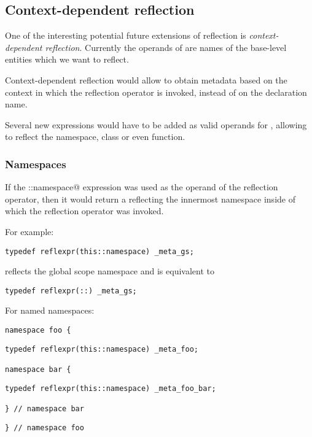 \subsection{Context-dependent reflection}
\label{context-dependent-reflection}

One of the interesting potential future extensions of reflection
is {\em context-dependent reflection}. Currently the operands of \verb@reflexpr@
are names of the base-level entities which we want to reflect.

Context-dependent reflection would allow to obtain metadata based on the context
in which the reflection operator is invoked, instead of on the declaration name.

Several new expressions would have to be added as valid operands for
\verb@reflexpr@, allowing to reflect the  namespace, class
or even function.

\subsubsection{Namespaces}

If the \verb@this::namespace@ expression was used as the operand of the reflection
operator, then it would return a  reflecting the innermost namespace
inside of which the reflection operator was invoked.

For example:

\begin{verbatim}
typedef reflexpr(this::namespace) _meta_gs;
\end{verbatim}

reflects the global scope namespace and is equivalent to

\begin{verbatim}
typedef reflexpr(::) _meta_gs;
\end{verbatim}

For named namespaces:

\begin{verbatim}
namespace foo {
\end{verbatim}
\begin{verbatim}
typedef reflexpr(this::namespace) _meta_foo;

namespace bar {
\end{verbatim}
\begin{verbatim}
typedef reflexpr(this::namespace) _meta_foo_bar;

} // namespace bar
\end{verbatim}
\begin{verbatim}
} // namespace foo
\end{verbatim}

